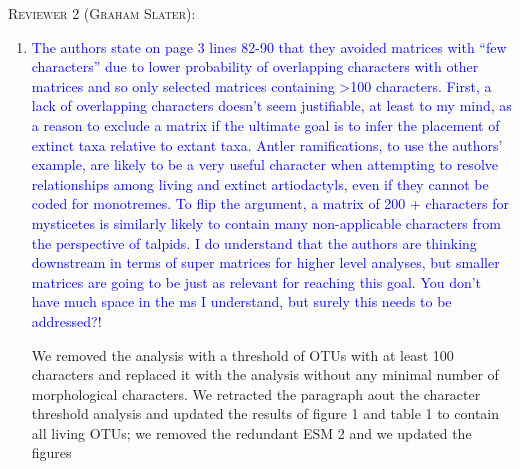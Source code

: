 \documentclass[12pt,letterpaper]{article}
\renewcommand{\section}[1]{%
\bigskip
\begin{center}
\begin{Large}
\normalfont\scshape #1
\medskip
\end{Large}
\end{center}}
\begin{document}

\section{Reviewer 2 (Graham Slater):}
\begin{enumerate}
\item{\textcolor{blue}{The authors state on page 3 lines 82-90 that they avoided matrices with ``few characters'' due to lower probability of overlapping characters with other matrices and so only selected matrices containing >100 characters. First, a lack of overlapping characters doesn’t seem justifiable, at least to my mind, as a reason to exclude a matrix if the ultimate goal is to infer the placement of extinct taxa relative to extant taxa. Antler ramifications, to use the authors' example, are likely to be a very useful character when attempting to resolve relationships among living and extinct artiodactyls, even if they cannot be coded for monotremes. To flip the argument, a matrix of 200 + characters for mysticetes is similarly likely to contain many non-applicable characters from the perspective of talpids. I do understand that the authors are thinking downstream in terms of super matrices for higher level analyses, but smaller matrices are going to be just as relevant for reaching this goal. You don't have much space in the ms I understand, but surely this needs to be addressed?!}}

We removed the analysis with a threshold of OTUs with at least 100 characters and replaced it with the analysis without any minimal number of morphological characters.
We retracted the paragraph aout the character threshold analysis and updated the results of figure 1 and table 1 to contain all living OTUs; we removed the redundant ESM 2 and we updated the figures


\end{enumerate}
\end{document}
